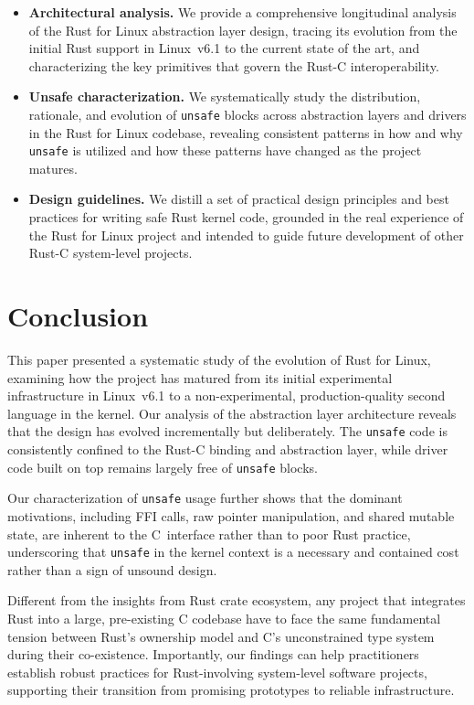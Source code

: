 \documentclass[conference]{IEEEtran}
\begin{document}
\begin{itemize}[leftmargin=*]
    \item \textbf{Architectural analysis.} We provide a comprehensive
    longitudinal analysis of the Rust for Linux abstraction layer design,
    tracing its evolution from the initial Rust support in Linux~v6.1 to the
    current state of the art, and characterizing the key primitives that
    govern the Rust-C interoperability.

    \item \textbf{Unsafe characterization.} We systematically study the
    distribution, rationale, and evolution of \texttt{unsafe} blocks across
    abstraction layers and drivers in the Rust for Linux codebase, revealing
    consistent patterns in how and why \texttt{unsafe} is utilized and how these
    patterns have changed as the project matures.

    \item \textbf{Design guidelines.} We distill a set of practical design
    principles and best practices for writing safe Rust kernel code, grounded
    in the real experience of the Rust for Linux project and intended to
    guide future development of other Rust-C system-level projects.
\end{itemize}







% 

\section{Conclusion}

This paper presented a systematic study of the evolution of Rust for Linux,
examining how the project has matured from its initial experimental
infrastructure in Linux~v6.1 to a non-experimental, production-quality
second language in the kernel.
Our analysis of the abstraction layer architecture reveals that the design
has evolved incrementally but deliberately. The \texttt{unsafe} code is
consistently confined to the Rust-C binding and abstraction layer, while
driver code built on top remains largely free of \texttt{unsafe} blocks.

Our characterization of \texttt{unsafe} usage further shows that the
dominant motivations, including FFI calls, raw pointer manipulation, and shared
mutable state, are inherent to the C~interface rather than to poor Rust
practice, underscoring that \texttt{unsafe} in the kernel context is
a necessary and contained cost rather than a sign of unsound design.

Different from the insights from Rust crate ecosystem, any project that integrates Rust into a large, pre-existing C codebase have to face the same fundamental tension between Rust's ownership model and C's unconstrained type system during their co-existence.
Importantly, our findings can help practitioners establish robust practices for Rust-involving system-level software projects, supporting their transition from promising prototypes to reliable infrastructure.



\end{document}

